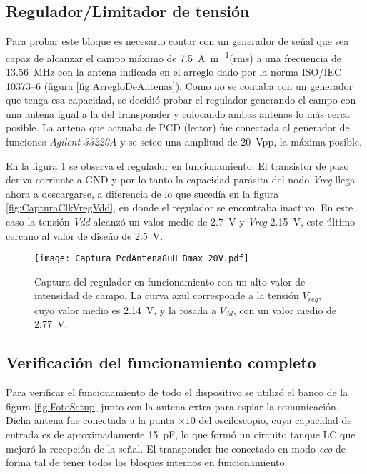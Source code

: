 \subsection{Regulador/Limitador de tensión}

Para probar este bloque es necesario contar con un generador de señal 
que sea capaz de alcanzar el campo máximo de 
\SI[per-mode=symbol]{7.5}{\ampere\per\meter}(rms) a una frecuencia de 
\SI{13.56}{\mega\hertz} con la antena indicada en el arreglo dado por 
la norma ISO/IEC 10373--6 (figura \ref{fig:ArregloDeAntenas}). Como no 
se contaba con un generador que tenga esa capacidad, se decidió probar 
el regulador generando el campo con una antena igual a la del 
transponder y colocando ambas antenas lo más cerca posible. La antena 
que actuaba de PCD (lector) fue conectada al generador de funciones 
\emph{Agilent 33220A} y se seteo una amplitud de \SI{20}{\volt}pp, la 
máxima posible.

En la figura \ref{fig:CapturaBmax} se observa el regulador en 
funcionamiento. El transistor de paso deriva corriente a GND y por lo 
tanto la capacidad parásita del nodo \emph{Vreg} llega ahora a 
descargarse, a diferencia de lo que sucedía en la figura 
\ref{fig:CapturaClkVregVdd}, en donde el regulador se encontraba 
inactivo. En este caso la tensión \emph{Vdd} alcanzó un valor medio 
de \SI{2.7}{\volt} y \emph{Vreg} \SI{2.15}{\volt}, este último cercano 
al valor de diseño de \SI{2.5}{\volt}.

\begin{figure}
	\centering
	\texttt{[image: Captura\_PcdAntena8uH\_Bmax\_20V.pdf]}
	\caption{Captura del regulador en funcionamiento con un alto valor 
	de intensidad de campo. La curva azul corresponde a la tensión 
	\(V_{reg}\), cuyo valor medio es \SI{2.14}{\volt}, y la rosada a 
	\(V_{dd}\), con un valor medio de \SI{2.77}{\volt}.}
	\label{fig:CapturaBmax}
\end{figure}


\subsection{Verificación del funcionamiento completo}

Para verificar el funcionamiento de todo el dispositivo se utilizó el 
banco de la figura \ref{fig:FotoSetup} junto con la antena extra para 
espiar la comunicación. Dicha antena fue conectada a la punta 
\(\times10\) del osciloscopio, cuya capacidad de entrada es de 
aproximadamente \SI{15}{\pico\farad}, lo que formó un circuito tanque 
LC que mejoró la recepción de la señal. El transponder fue conectado 
en modo \emph{eco} de forma tal de tener todos los bloques internos 
en funcionamiento.

